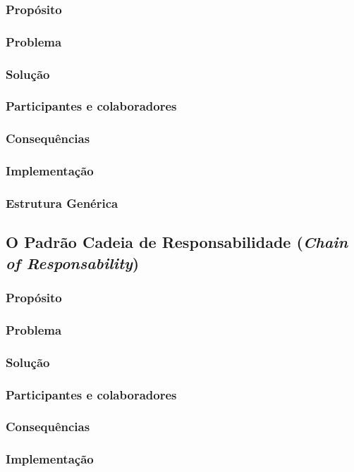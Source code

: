 \documentclass[
	11pt,				%
	openright,
	twoside,			%
	a4paper,			%
	english,			%
	french,
	brazil,				%
	sumario=tradicional
	]{abntex2}
\begin{document}
\subsubsection{Propósito}
\subsubsection{Problema}
\subsubsection{Solução}
\subsubsection{Participantes e colaboradores}
\subsubsection{Consequências}
\subsubsection{Implementação}
\subsubsection{Estrutura Genérica}

\subsection{O Padrão Cadeia de Responsabilidade (\textit{Chain of Responsability})}
\subsubsection{Propósito}
\subsubsection{Problema}
\subsubsection{Solução}
\subsubsection{Participantes e colaboradores}
\subsubsection{Consequências}
\subsubsection{Implementação}
\end{document}
